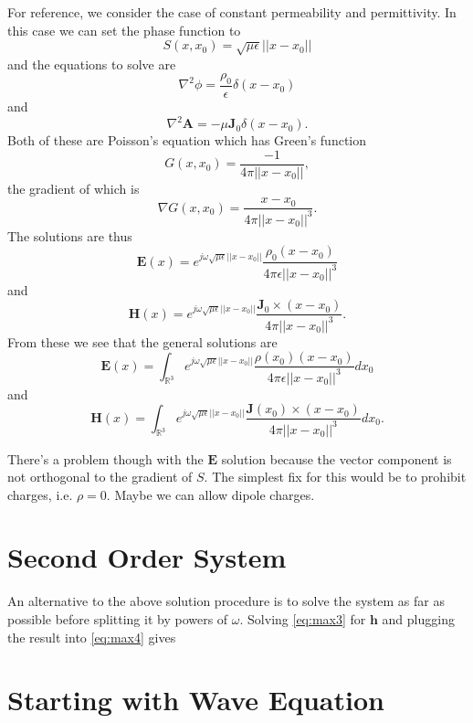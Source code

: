\documentclass{article}
\newcommand{\norm}[1]{||#1||}
\theoremstyle{plain}
\begin{document}
For reference, we consider the case of constant permeability and permittivity. In this case we can set the phase function to
\begin{equation}
	S(x,x_0) = \sqrt{\mu\epsilon}\norm{x-x_0}
\end{equation}
and the equations to solve are
\begin{equation}
	\nabla^2\phi = \frac{\rho_0}{\epsilon}\delta(x-x_0)
\end{equation}
and
\begin{equation}
	\nabla^2\mathbf{A} = -\mu\mathbf{J}_0\delta(x-x_0).
\end{equation}
Both of these are Poisson's equation which has Green's function
\begin{equation}
	G(x,x_0) = \frac{-1}{4\pi\norm{x-x_0}},
\end{equation}
the gradient of which is
\begin{equation}
	\nabla G(x,x_0) = \frac{x-x_0}{4\pi\norm{x-x_0}^3}.
\end{equation}
The solutions are thus
\begin{equation}
	\mathbf{E}(x) = e^{j\omega\sqrt{\mu\epsilon}\norm{x-x_0}}\frac{\rho_0(x-x_0)}{4\pi\epsilon\norm{x-x_0}^3}
\end{equation}
and
\begin{equation}
	\mathbf{H}(x) = e^{j\omega\sqrt{\mu\epsilon}\norm{x-x_0}}\frac{\mathbf{J}_0\times(x-x_0)}{4\pi\norm{x-x_0}^3}.
\end{equation}
From these we see that the general solutions are
\begin{equation}
	\mathbf{E}(x) = \int_{\mathbb{R}^3} e^{j\omega\sqrt{\mu\epsilon}\norm{x-x_0}}\frac{\rho(x_0)(x-x_0)}{4\pi\epsilon\norm{x-x_0}^3} dx_0
\end{equation}
and
\begin{equation}
	\mathbf{H}(x) = \int_{\mathbb{R}^3} e^{j\omega\sqrt{\mu\epsilon}\norm{x-x_0}}\frac{\mathbf{J}(x_0)\times(x-x_0)}{4\pi\norm{x-x_0}^3} dx_0.
\end{equation}

There's a problem though with the $\mathbf{E}$ solution because the vector component is not orthogonal to the gradient of $S$. The simplest fix for this would be to prohibit charges, i.e. $\rho=0$. Maybe we can allow dipole charges.



\section{Second Order System}

An alternative to the above solution procedure is to solve the system as far as possible before splitting it by powers of $\omega$. Solving \eqref{eq:max3} for $\mathbf{h}$ and plugging the result into \eqref{eq:max4} gives



\section{Starting with Wave Equation}
\end{document}
